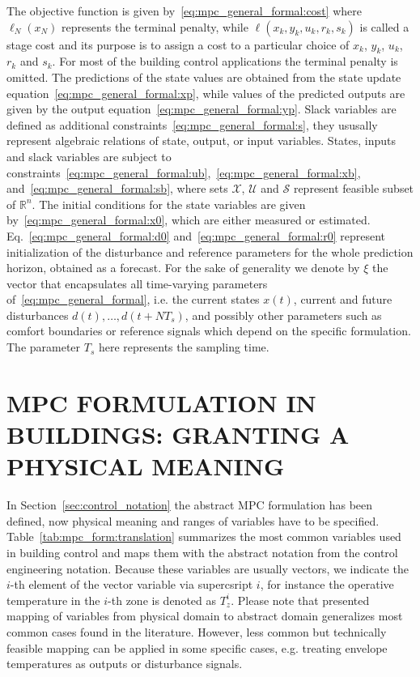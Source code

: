 \documentclass[10pt]{extarticle}
\begin{document}
The objective function is given by~\eqref{eq:mpc_general_formal:cost} where   $\ell_N(x_N)$  represents the terminal penalty, while $\ell(x_k,y_k,u_k,r_k,s_k)$  is called a stage cost and its
purpose is to assign a cost to a particular choice of $x_k$, $y_k$, $u_k$, $r_k$ and $s_k$. For most of the building control applications the terminal penalty is omitted.
The predictions of the state values are obtained from the state update equation~\eqref{eq:mpc_general_formal:xp}, while values of the predicted outputs are given by
the output equation~\eqref{eq:mpc_general_formal:yp}.
Slack variables are defined as additional constraints~\eqref{eq:mpc_general_formal:s}, they ususally represent algebraic relations of state, output, or input variables.
% 
States, inputs and slack variables are subject to
constraints~\eqref{eq:mpc_general_formal:ub},~\eqref{eq:mpc_general_formal:xb}, and~\eqref{eq:mpc_general_formal:sb},
where sets  $\mathcal{X}$, $\mathcal{U}$ and $\mathcal{S}$ represent feasible subset of $\mathbb{R}^{n}$. 
% 
The initial conditions for the state variables are given by~\eqref{eq:mpc_general_formal:x0}, which are either  measured or estimated. 
Eq.~\eqref{eq:mpc_general_formal:d0} and~\eqref{eq:mpc_general_formal:r0} represent initialization of the disturbance and reference parameters for the whole prediction horizon, obtained as a forecast.
% 
For the sake of generality we denote by $\xi$ the vector that encapsulates all time-varying parameters
of~\eqref{eq:mpc_general_formal}, i.e. the current states $x(t)$,
current and future disturbances $d(t), \ldots, d(t+N T_s)$, and possibly other parameters such as comfort boundaries or reference signals which depend on the specific formulation.
The parameter $T_s$ here represents the sampling time.

\section{MPC FORMULATION IN BUILDINGS: GRANTING A PHYSICAL MEANING }

In Section~\ref{sec:control_notation} the abstract MPC formulation has been defined, 
now physical meaning and ranges of variables have to be specified.
Table~\ref{tab:mpc_form:translation} summarizes the most common
variables used in building control and maps them with the abstract
notation from the control engineering notation. 
Because these variables are usually vectors, we indicate the
$i$-th element of the vector variable via supercsript $i$,
for instance the operative temperature in the $i$-th zone is denoted as $T_z^i$.
Please note that presented mapping of  variables from physical domain to abstract domain generalizes most common cases found in the literature. However, less common 
but technically feasible mapping can be applied in some specific cases, e.g. treating envelope temperatures as outputs or disturbance signals.
\end{document}
